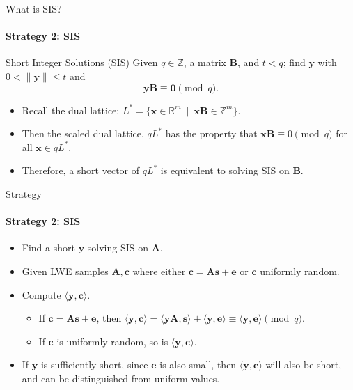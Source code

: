 \documentclass[10pt,compress]{beamer}
\renewcommand{\vec}[1]{\mathbf{#1}\xspace}
\newcommand{\A}{\vec{A}}
\newcommand{\s}{\vec{s}}
\newcommand{\ip}[2]{\langle #1, #2 \rangle}
\renewcommand{\vec}[1]{\mathbf{#1}\xspace}
\begin{document}
\begin{frame}{What is SIS?}
  \framesubtitle{Strategy 2: SIS}
  \begin{alertblock}{Short Integer Solutions (SIS)}
    Given $q \in \mathbb{Z}$, a matrix $\vec{B}$, and $t < q$; find $\vec{y}$ with $0 < \| \vec{y} \| \leq t$ and
    \[\vec{y} \vec{B} \equiv  \vec{0} \pmod{q}.\]
  \end{alertblock}

  
  \begin{itemize}
  \item Recall the dual lattice: $L^* = \{ \vec{x} \in \mathbb{R}^m \enspace | \enspace \vec{x} \vec{B} \in \mathbb{Z}^m \}$. 
  \item Then the scaled dual lattice, $qL^*$ has the property that $ \vec{x} \vec{B} \equiv 0 \pmod{q}$ for all $\vec{x} \in qL^*$. 
  \item Therefore, a short vector of $qL^*$ is equivalent to solving SIS on $\vec{B}$.
  \end{itemize}

\end{frame}

\begin{frame}{Strategy}
  \framesubtitle{Strategy 2: SIS}
  \begin{itemize}
  \item Find a short $\vec{y}$ solving SIS on $\vec{A}$. 
  \item Given LWE samples $\vec{A}, \vec{c}$ where either $\vec{c} = \A\s + \vec{e}$ or $\vec{c}$ uniformly random. 
  \item Compute $\ip{\vec{y}}{\vec{c}}$. 
    \begin{itemize}
    \item If $\vec{c} = \A\s + \vec{e}$, then $\ip{\vec{y}}{\vec{c}} = \ip{\vec{y}\A}{\s} + \ip{\vec{y}}{\vec{e}} \equiv \ip{\vec{y}}{\vec{e}} \pmod{q}$.
    \item If $\vec{c}$ is uniformly random, so is $\ip{\vec{y}}{\vec{c}}$.
    \end{itemize} 
  \item If $\vec{y}$ is sufficiently short, since $\vec{e}$ is also small, then $\ip{\vec{y}}{\vec{e}}$ will also be short, and can be distinguished from uniform values.

  \end{itemize}
\end{frame}
\end{document}
